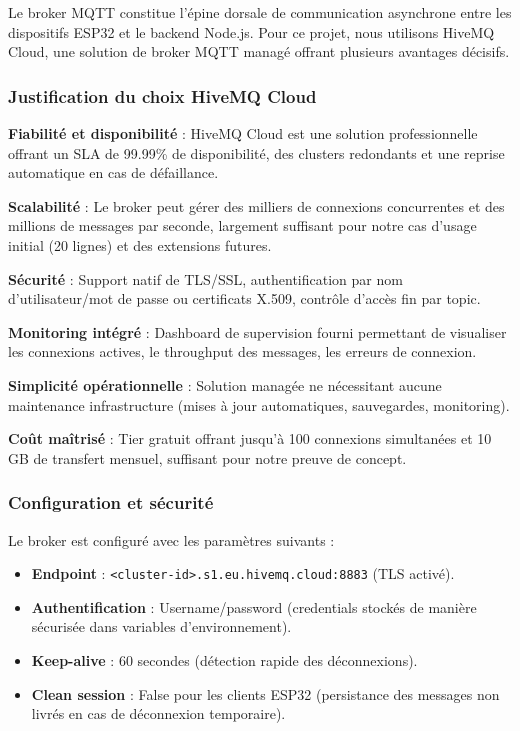 Le broker MQTT constitue l'épine dorsale de communication asynchrone entre les dispositifs ESP32 et le backend Node.js. Pour ce projet, nous utilisons HiveMQ Cloud, une solution de broker MQTT managé offrant plusieurs avantages décisifs.

\subsubsection{Justification du choix HiveMQ Cloud}

\textbf{Fiabilité et disponibilité} : HiveMQ Cloud est une solution professionnelle offrant un SLA de 99.99\% de disponibilité, des clusters redondants et une reprise automatique en cas de défaillance.

\textbf{Scalabilité} : Le broker peut gérer des milliers de connexions concurrentes et des millions de messages par seconde, largement suffisant pour notre cas d'usage initial (20 lignes) et des extensions futures.

\textbf{Sécurité} : Support natif de TLS/SSL, authentification par nom d'utilisateur/mot de passe ou certificats X.509, contrôle d'accès fin par topic.

\textbf{Monitoring intégré} : Dashboard de supervision fourni permettant de visualiser les connexions actives, le throughput des messages, les erreurs de connexion.

\textbf{Simplicité opérationnelle} : Solution managée ne nécessitant aucune maintenance infrastructure (mises à jour automatiques, sauvegardes, monitoring).

\textbf{Coût maîtrisé} : Tier gratuit offrant jusqu'à 100 connexions simultanées et 10 GB de transfert mensuel, suffisant pour notre preuve de concept.

\subsubsection{Configuration et sécurité}

Le broker est configuré avec les paramètres suivants :

\begin{itemize}
    \item \textbf{Endpoint} : \texttt{<cluster-id>.s1.eu.hivemq.cloud:8883} (TLS activé).
    \item \textbf{Authentification} : Username/password (credentials stockés de manière sécurisée dans variables d'environnement).
    \item \textbf{Keep-alive} : 60 secondes (détection rapide des déconnexions).
    \item \textbf{Clean session} : False pour les clients ESP32 (persistance des messages non livrés en cas de déconnexion temporaire).
\end{itemize}

